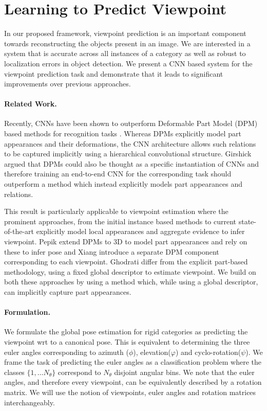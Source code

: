 \section{Learning to Predict Viewpoint}

In our proposed framework, viewpoint prediction is an important component towards reconstructing the objects present in an image. We are interested in a system that is accurate across all instances of a category as well as robust to localization errors in object detection. We present a CNN based system for the viewpoint prediction task and demonstrate  that it leads to significant improvements over previous approaches.


\paragraph{Related Work.}
Recently, CNNs have been shown to outperform Deformable Part Model (DPM) \cite{felzens_latent_pami10} based methods for recognition tasks \cite{rcnn,Krizhevsky}. Whereas DPMs explicitly model part appearances and their deformations, the CNN architecture allows such relations to be captured implicitly using a hierarchical convolutional structure.  Girshick \etal \cite{DPMsCNNs} argued that DPMs could also be thought as a specific instantiation of CNNs and therefore training an end-to-end CNN for the corresponding task should outperform a method which instead explicitly models part appearances and relations.

This result is particularly applicable to viewpoint estimation where the prominent approaches, from the initial instance based methods \cite{huttenlocher1990recognizing} to current state-of-the-art  \cite{pascal3d,pepik12dpm} explicitly model local appearances and aggregate evidence to infer viewpoint. Pepik \etal \cite{pepik12dpm} extend DPMs to 3D to model part appearances and rely on these to infer pose and Xiang \etal \cite{pascal3d} introduce a separate DPM component corresponding to each viewpoint. Ghodrati \etal \cite{ghodrati14viewpoint} differ from the explicit part-based methodology, using a fixed global descriptor to estimate viewpoint. We build on both these approaches by using a method which, while using a global descriptor, can implicitly capture part appearances.


\paragraph{Formulation.}
We formulate the global pose estimation for rigid categories as predicting the viewpoint wrt to a canonical pose. This is equivalent to determining the three euler angles corresponding to azimuth ($\phi$), elevation($\varphi$) and cyclo-rotation($\psi$). We frame the task of predicting the euler angles as a classification problem where the classes $\{1,\ldots N_{\theta}\}$ correspond to $N_{\theta}$ disjoint angular bins. We note that the euler angles, and therefore every viewpoint, can be equivalently described by a rotation matrix. We will use the notion of viewpoints, euler angles and rotation matrices interchangeably.


